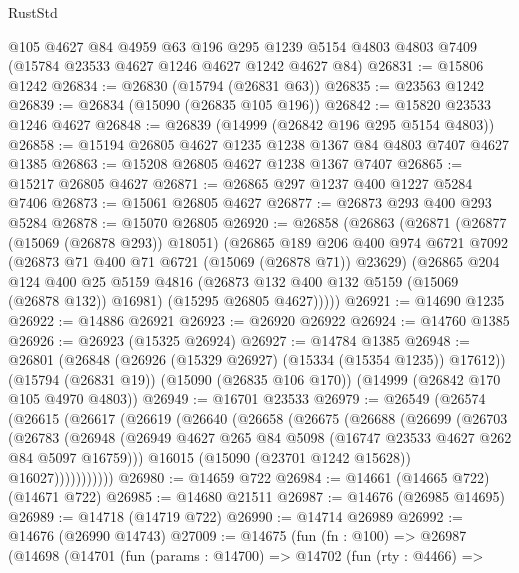 \begin{lexlean}{RustStd}
\begin{coremodule}
    @105
    @4627
    @84
    @4959
    @63
    @196
    @295
    @1239
    @5154
    @4803
    @4803
    @7409
    (@15784 @23533 @4627 @1246 @4627 @1242 @4627 @84)
@26831 := @15806 @1242
@26834 := @26830 (@15794 (@26831 @63))
@26835 := @23563 @1242
@26839 := @26834 (@15090 (@26835 @105 @196))
@26842 := @15820 @23533 @1246 @4627
@26848 := @26839 (@14999 (@26842 @196 @295 @5154 @4803))
@26858 := @15194 @26805 @4627 @1235 @1238 @1367 @84 @4803 @7407 @4627 @1385
@26863 := @15208 @26805 @4627 @1238 @1367 @7407
@26865 := @15217 @26805 @4627
@26871 := @26865 @297 @1237 @400 @1227 @5284 @7406
@26873 := @15061 @26805 @4627
@26877 := @26873 @293 @400 @293 @5284
@26878 := @15070 @26805
@26920 := @26858
    (@26863
      (@26871
        (@26877 (@15069 (@26878 @293)) @18051)
        (@26865
          @189
          @206
          @400
          @974
          @6721
          @7092
          (@26873 @71 @400 @71 @6721 (@15069 (@26878 @71)) @23629)
          (@26865
            @204
            @124
            @400
            @25
            @5159
            @4816
            (@26873 @132 @400 @132 @5159 (@15069 (@26878 @132)) @16981)
            (@15295 @26805 @4627)))))
@26921 := @14690 @1235
@26922 := @14886 @26921
@26923 := @26920 @26922
@26924 := @14760 @1385
@26926 := @26923 (@15325 @26924)
@26927 := @14784 @1385
@26948 := @26801
    (@26848 (@26926 (@15329 @26927) (@15334 (@15354 @1235)) @17612))
    (@15794 (@26831 @19))
    (@15090 (@26835 @106 @170))
    (@14999 (@26842 @170 @105 @4970 @4803))
@26949 := @16701 @23533
@26979 := @26549
    (@26574
      (@26615
        (@26617
          (@26619
            (@26640
              (@26658
                (@26675
                  (@26688
                    (@26699
                      (@26703
                        (@26783
                          (@26948
                            (@26949
                              @4627
                              @265
                              @84
                              @5098
                              (@16747 @23533 @4627 @262 @84 @5097 @16759)))
                          @16015
                          (@15090 (@23701 @1242 @15628))
                          @16027)))))))))))
@26980 := @14659 @722
@26984 := @14661 (@14665 @722) (@14671 @722)
@26985 := @14680 @21511
@26987 := @14676 (@26985 @14695)
@26989 := @14718 (@14719 @722)
@26990 := @14714 @26989
@26992 := @14676 (@26990 @14743)
@27009 := @14675
    (fun (fn : @100) =>
    @26987
      (@14698
        (@14701
          (fun (params : @14700) =>
          @14702
            (fun (rty : @4466) =>

\end{coremodule}
\end{lexlean}

